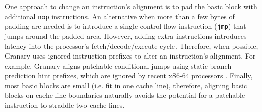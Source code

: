 \documentclass[preprint]{sigplanconf}
\begin{document}

One approach to change an instruction's alignment is to pad the basic block with additional \texttt{nop} instructions. An alternative when more than a few bytes of padding are needed is to introduce a single control-flow instruction (\texttt{jmp}) that jumps around the padded area. However, adding extra instructions introduces latency into the processor's fetch/decode/execute cycle. Therefore, when possible, Granary uses ignored instruction prefixes to alter an instruction's alignment. For example, Granary aligns patchable conditional jumps using static branch prediction hint prefixes, which are ignored by recent x86-64 processors \cite{AgnerMicroarchitecture}. Finally, most basic blocks are small (i.e. fit in one cache line), therefore, aligning basic blocks on cache line boundaries naturally avoids the potential for a patchable instruction to straddle two cache lines.
\end{document}
